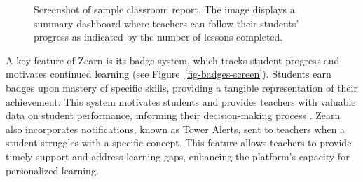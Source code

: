 \documentclass[
  number,
  preprint,
  3p,
  onecolumn]{elsarticle}
\begin{document}
\begin{figure}


\caption{\label{fig-class-report}Screenshot of sample classroom report.
The image displays a summary dashboard where teachers can follow their
students' progress as indicated by the number of lessons completed.}

\end{figure}%

A key feature of Zearn is its badge system, which tracks student
progress and motivates continued learning (see
Figure~\ref{fig-badges-screen}). Students earn badges upon mastery of
specific skills, providing a tangible representation of their
achievement. This system motivates students and provides teachers with
valuable data on student performance, informing their decision-making
process \citep{knudsen2020}. Zearn also incorporates notifications,
known as Tower Alerts, sent to teachers when a student struggles with a
specific concept. This feature allows teachers to provide timely support
and address learning gaps, enhancing the platform's capacity for
personalized learning.
\end{document}
